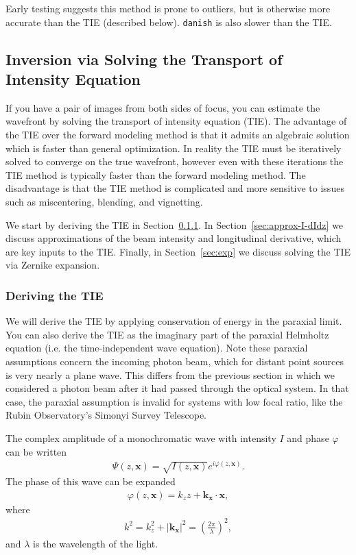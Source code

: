 \documentclass[TS,authoryear,toc]{lsstdoc}
\begin{document}
Early testing suggests this method is prone to outliers, but is otherwise more accurate than the TIE (described below).
\texttt{danish} is also slower than the TIE.


\subsection{Inversion via Solving the Transport of Intensity Equation}

If you have a pair of images from both sides of focus, you can estimate the wavefront by solving the transport of intensity equation (TIE).
The advantage of the TIE over the forward modeling method is that it admits an algebraic solution which is faster than general optimization.
In reality the TIE must be iteratively solved to converge on the true wavefront, however even with these iterations the TIE method is typically faster than the forward modeling method.
The disadvantage is that the TIE method is complicated and more sensitive to issues such as miscentering, blending, and vignetting.

We start by deriving the TIE in Section~\ref{sec:tie-derivation}.
In Section~\ref{sec:approx-I-dIdz} we discuss approximations of the beam intensity and longitudinal derivative, which are key inputs to the TIE.
Finally, in Section~\ref{sec:exp} we discuss solving the TIE via Zernike expansion.


\subsubsection{Deriving the TIE}
\label{sec:tie-derivation}

We will derive the TIE by applying conservation of energy in the paraxial limit.
You can also derive the TIE as the imaginary part of the paraxial Helmholtz equation (i.e. the time-independent wave equation).
Note these paraxial assumptions concern the incoming photon beam, which for distant point sources is very nearly a plane wave.
This differs from the previous section in which we considered a photon beam after it had passed through the optical system.
In that case, the paraxial assumption is invalid for systems with low focal ratio, like the Rubin Observatory's Simonyi Survey Telescope. 

The complex amplitude of a monochromatic wave with intensity $I$ and phase $\varphi$ can be written
\begin{align}
    \Psi(z, \mathbf{x}) = \sqrt{I(z, \mathbf{x})} e^{i\varphi(z, \mathbf{x})}.
\end{align}
The phase of this wave can be expanded
\begin{align}
    \varphi(z, \mathbf{x}) = k_z z + \mathbf{k}_\mathbf{x} \cdot \mathbf{x},
\end{align}
where
\begin{align}
    k^2 = k_z^2 + |\mathbf{k}_\mathbf{x}|^2  = \left(\frac{2\pi}{\lambda}\right)^2,
\end{align}
and $\lambda$ is the wavelength of the light.
\end{document}
